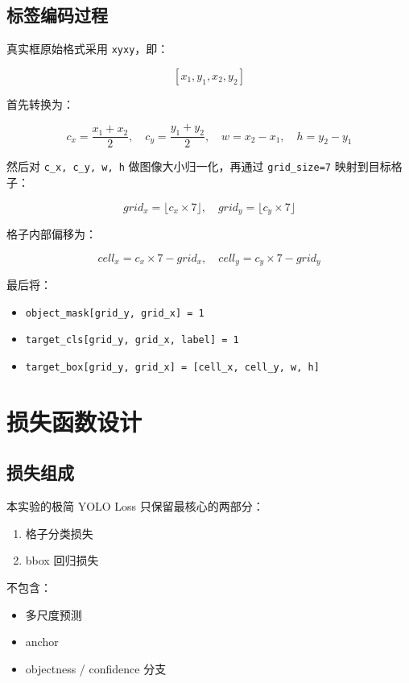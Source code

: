 \documentclass[11pt,a4paper]{article}
\begin{document}
\subsection{标签编码过程}

真实框原始格式采用 \texttt{xyxy}，即：

\[
[x_1, y_1, x_2, y_2]
\]

首先转换为：

\[
c_x = \frac{x_1 + x_2}{2}, \quad c_y = \frac{y_1 + y_2}{2}, \quad w = x_2 - x_1, \quad h = y_2 - y_1
\]

然后对 \texttt{c\_x, c\_y, w, h} 做图像大小归一化，再通过 \texttt{grid\_size=7} 映射到目标格子：

\[
grid_x = \lfloor c_x \times 7 \rfloor, \quad grid_y = \lfloor c_y \times 7 \rfloor
\]

格子内部偏移为：

\[
cell_x = c_x \times 7 - grid_x, \quad cell_y = c_y \times 7 - grid_y
\]

最后将：
\begin{itemize}
  \item \texttt{object\_mask[grid\_y, grid\_x] = 1}
  \item \texttt{target\_cls[grid\_y, grid\_x, label] = 1}
  \item \texttt{target\_box[grid\_y, grid\_x] = [cell\_x, cell\_y, w, h]}
\end{itemize}

\section{损失函数设计}

\subsection{损失组成}

本实验的极简 YOLO Loss 只保留最核心的两部分：

\begin{enumerate}
  \item 格子分类损失
  \item bbox 回归损失
\end{enumerate}

不包含：

\begin{itemize}
  \item 多尺度预测
  \item anchor
  \item objectness / confidence 分支
\end{itemize}
\end{document}
